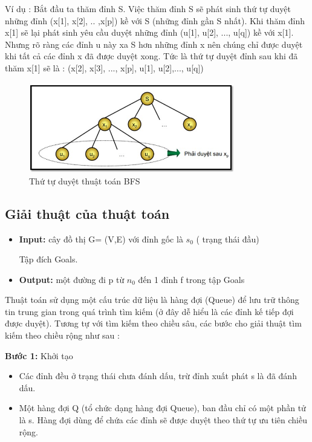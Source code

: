 Ví dụ : Bắt đầu ta thăm đỉnh S. Việc thăm đỉnh S sẽ phát sinh thứ tự duyệt những
đỉnh (x[1], x[2], .. ,x[p]) kề với S (những đỉnh gần S nhất). Khi thăm đỉnh x[1] sẽ
lại phát sinh yêu cầu duyệt những đỉnh (u[1], u[2], ..., u[q]) kề với x[1]. Nhưng rõ
ràng các đỉnh u này xa S hơn những đỉnh x nên chúng chỉ được duyệt khi tất cả các
đỉnh x đã được duyệt xong. Tức là thứ tự duyệt đỉnh sau khi đã thăm x[1] sẽ là :
(x[2], x[3], ..., x[p], u[1], u[2],..., u[q])

\begin{figure}[h!]
	\centering
	\includegraphics[width=0.8\textwidth]{
		Figures/figs/ThuTuBFS.jpg
	}
	\caption[Thứ tự duyệt thuật toán BFS]{
		Thứ tự duyệt thuật toán BFS
	}
	\label{fig:hinhc}
\end{figure}

\subsection{Giải thuật của thuật toán}
\begin{itemize}
	\item \textbf{Input:} cây đồ thị G= (V,E) với đỉnh gốc là $s_0$ ( trạng thái đầu)
	
	Tập đích Goals.
	\item \textbf{Output:} một đường đi p từ $n_0$ đến 1 đỉnh f trong tập Goals
\end{itemize}

Thuật toán sử dụng một cấu trúc dữ liệu là hàng đợi (Queue) để lưu trữ thông tin
trung gian trong quá trình tìm kiếm (ở đây dễ hiểu là các đỉnh kế tiếp đợi được
duyệt). Tương tự với tìm kiếm theo chiều sâu, các bước cho giải thuật tìm kiếm
theo chiều rộng như sau :

\textbf{Bước 1:} Khởi tạo
\begin{itemize}
	\item Các đỉnh đều ở trạng thái chưa đánh dấu, trừ đỉnh xuất phát s là đã đánh
	dấu.
	\item Một hàng đợi Q (tổ chức dạng hàng đợi Queue), ban đầu chỉ có một phần tử
	là s. Hàng đợi dùng để chứa các đỉnh sẽ được duyệt theo thứ tự ưu tiên
	chiều rộng.
\end{itemize}

